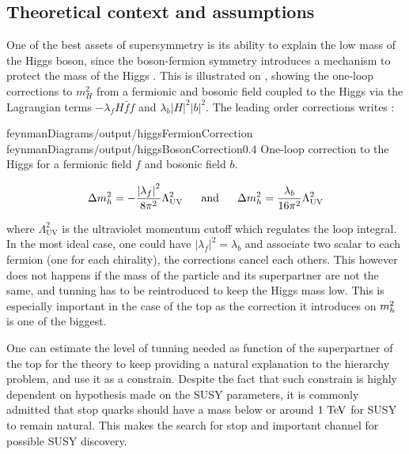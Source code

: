         \subsection{Theoretical context and assumptions}


        One of the best assets of supersymmetry is its ability to explain the low mass
        of the Higgs boson, since the boson-fermion symmetry introduces a mechanism to
        protect the mass of the Higgs . This is illustrated on
        , showing the one-loop corrections to $m_H^2$
        from a fermionic and bosonic field coupled to the Higgs via the Lagrangian terms
        $- \lambda_f H \bar{f} f$ and $\lambda_b \left| H \right|^2 \left| b \right|^2$.
        The leading order corrections writes :

        {feynmanDiagrams/output/higgsFermionCorrection}
        {feynmanDiagrams/output/higgsBosonCorrection}{0.4}
        {One-loop correction to the Higgs for a fermionic field $f$ and bosonic field $b$.}

        \begin{equation}
            \Delta m_{h}^2 = - \frac{\left| \lambda_f \right|^2}{8\pi^2} \Lambda^2_{\text{UV}}
            \, \, \, \, \, \, \, \, \, \, \text{and} \, \, \, \, \, \, \, \, \, \,
            \Delta m_{h}^2 =   \frac{\lambda_b}{16\pi^2} \Lambda^2_{\text{UV}}
        \end{equation}

        where $\Lambda^2_{\text{UV}}$ is the ultraviolet momentum cutoff which regulates
        the loop integral. In the most ideal case, one could have $\left| \lambda_f \right|^2
        = \lambda_b$ and associate two scalar to each fermion (one for each chirality),
        the corrections cancel each others. 
        This however does not happens if the mass of the particle and its superpartner
        are not the same, and tunning has to be reintroduced to keep the Higgs mass low.
        This is especially important in the case of the top as the correction it introduces
        on $m_{h}^2$ is one of the biggest.

        One can estimate the level of tunning needed as function of the superpartner of
        the top for the theory to keep providing a natural explanation to the hierarchy
        problem, and use it as a constrain. Despite the fact that such constrain is
        highly dependent on hypothesis made on the SUSY parameters, it is commonly admitted
        that stop quarks should have a mass below or around $1~\text{TeV}$ for SUSY to remain natural.
        This makes the search for stop and important channel for possible SUSY discovery.

